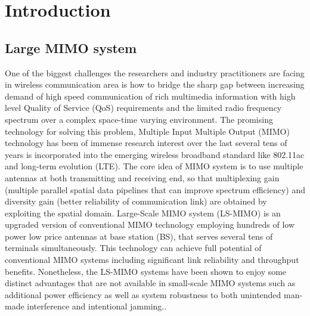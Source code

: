 \resetdatestamp







\chapter{Introduction} \label{introduction}
\section{Large MIMO system}

  One of the biggest challenges the researchers and industry practitioners are facing in wireless communication area is how to bridge the sharp gap between increasing demand of high speed communication of rich multimedia information with high level Quality of Service (QoS) requirements and the limited radio frequency spectrum over a complex space-time varying environment. The promising technology for solving this problem, Multiple Input Multiple Output (MIMO) technology has been of immense research interest over the last several tens of years is incorporated into the emerging wireless broadband standard like 802.11ac\cite{IEEE802.11ac} and long-term evolution (LTE)\cite{3GLTE}.  The core idea of MIMO system is to use multiple antennas at both transmitting and receiving end, so that multiplexing gain (multiple parallel spatial data pipelines that can improve spectrum efficiency) and diversity gain (better reliability of communication link) are obtained by exploiting the spatial domain\cite{oestges2010mimo}. Large-Scale MIMO system (LS-MIMO) is an upgraded version of conventional MIMO technology employing hundreds of low power low price antennas at base station (BS), that serves several tens of terminals simultaneously. This technology can achieve full potential of conventional MIMO systems including significant link reliability and throughput benefits. Nonetheless, the LS-MIMO systems have been shown to enjoy some distinct advantages
that are not available in small-scale MIMO systems such as additional power efficiency as well as system robustness to both unintended man-made interference and intentional jamming.\cite{rusek2013scaling}\cite{larsson2014massive}. 
